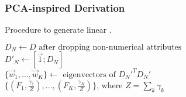 
\subsubsection{PCA-inspired \View Derivation}\label{candidatesec}


\setlength{\textfloatsep}{0mm}
\begin{algorithm}[t]
	\caption{Procedure to generate linear \views.}
	\label{fig:pca}
	\LinesNumbered
	\small{ 
                $D_N  \gets D {\mbox{ after dropping non-numerical attributes}}$  \label{algo2:line1}\\ 
                $D'_N  \gets [\vec{1} ; D_N]$ \label{algo2:line2} \\
                $\{\vec{w}_1,\ldots,\vec{w}_K\} \gets {\mbox{ eigenvectors of }} {D_N'}^T D_N'$ \label{algo2:line31} \\
                \Return $\{(F_1,\frac{\gamma_1}{Z}),\ldots,(F_K,\frac{\gamma_K}{Z})\}$, where
                $Z = \sum_k \gamma_k$\label{algo2:line35}
	}
\end{algorithm}
\setlength{\textfloatsep}{5pt}
 
